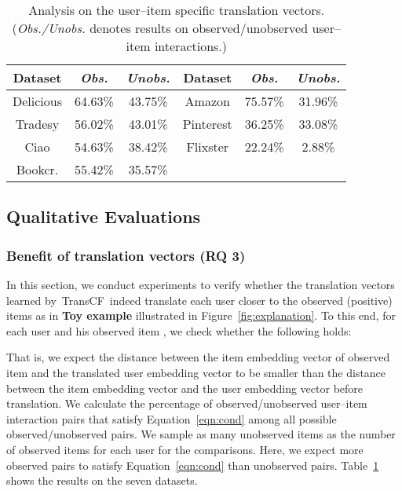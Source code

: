 \documentclass[conference]{IEEEtran}
\newcommand{\propose}{\textsf{{TransCF}}}
\begin{document}
\begin{table}[h]
	\centering
\caption{Analysis on the user--item specific translation vectors. (\textit{Obs./Unobs.} denotes results on observed/unobserved user--item interactions.)}
	\vspace{-1ex}
	\label{tab:posneg}
\begin{tabular}{c|cc||c|cc}
		\hline
		Dataset & \textit{Obs.} & \textit{Unobs.}&Dataset & \textit{Obs.} & \textit{Unobs.} \\
		\hline
		\hline
		Delicious    & 64.63\%  & 43.75\% &Amazon   & 75.57\%  & 31.96\%    \\
		Tradesy      & 56.02\%  & 43.01\% &Pinterest    & 36.25\%  & 33.08\%    \\
		Ciao         & 54.63\%  & 38.42\% &Flixster    & 22.24\%  & 2.88\%         \\
		Bookcr. & 55.42\%  & 35.57\%   &&& \\
		\hline
	\end{tabular}
	\vspace{-2ex}
\end{table}

\subsection{Qualitative Evaluations}
\vspace{-0.5ex}
\label{exp:qual}
\subsubsection{\textbf{Benefit of translation vectors (RQ 3)}} 
In this section, we conduct experiments to verify whether the translation vectors learned by~\propose~indeed translate each user closer to the observed (positive) items as in \textbf{Toy example} illustrated in Figure~\ref{fig:explanation}.
To this end, for each user  and his observed item , we check whether the following holds: 

That is, we expect the distance between the item embedding vector  of observed item  and the translated user embedding vector  to be smaller than the distance between the item embedding vector  and the user embedding vector  before translation.
We calculate the percentage of observed/unobserved
user--item interaction pairs that satisfy Equation~\ref{eqn:cond} among all possible observed/unobserved pairs. 
We sample as many unobserved items as the number of observed items for each user for the comparisons. 
Here, we expect more observed pairs to satisfy Equation~\ref{eqn:cond} than unobserved pairs.
Table~\ref{tab:posneg} shows the results on the seven datasets. 
\end{document}
